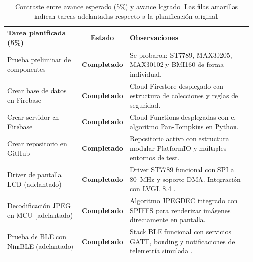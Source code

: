 \documentclass[letterpaper,11pt]{article}
\begin{document}
\begin{table}[H]
    \centering
    \renewcommand{\arraystretch}{1.3}
    \begin{tabular}{|L{5cm}|c|L{6cm}|}
        \hline
        \textbf{Tarea planificada (5\%)}     & \textbf{Estado}        & \textbf{Observaciones}                                                                      \\ \hline
        Prueba preliminar de componentes     & \textcolor{green!60!black}{\textbf{Completado}} & Se probaron: ST7789, MAX30205, MAX30102 y BMI160 de forma individual.                       \\ \hline
        Crear base de datos en Firebase      & \textcolor{green!60!black}{\textbf{Completado}} & Cloud Firestore desplegado con estructura de colecciones y reglas de seguridad.              \\ \hline
        Crear servidor en Firebase           & \textcolor{green!60!black}{\textbf{Completado}} & Cloud Functions desplegadas con el algoritmo Pan-Tompkins \citep{pan_tompkins} en Python.                        \\ \hline
        Crear repositorio en GitHub          & \textcolor{green!60!black}{\textbf{Completado}} & Repositorio activo con estructura modular PlatformIO y múltiples entornos de test.          \\ \hline
        Driver de pantalla LCD (adelantado)  & \textcolor{green!60!black}{\textbf{Completado}} & Driver ST7789 funcional con SPI a 80~MHz y soporte DMA. Integración con LVGL 8.4 \citep{lvgl_ref}.          \\ \hline
        Decodificación JPEG en MCU (adelantado)  & \textcolor{green!60!black}{\textbf{Completado}} & Algoritmo JPEGDEC \citep{jpegdec_ref} integrado con SPIFFS \citep{espspiffs_ref} para renderizar imágenes directamente en pantalla.   \\ \hline
        Prueba de BLE con NimBLE (adelantado)    & \textcolor{green!60!black}{\textbf{Completado}} & Stack BLE funcional con servicios GATT, bonding y notificaciones de telemetría simulada \citep{nimble_ref}.    \\ \hline
    \end{tabular}
    \caption{Contraste entre avance esperado (5\%) y avance logrado. Las filas amarillas indican tareas adelantadas respecto a la planificación original.}
    \label{tab:avance}
\end{table}
\end{document}

